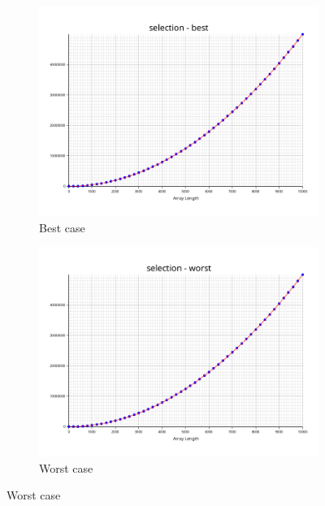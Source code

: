\documentclass[a4paper]{article}
\begin{document}
\begin{figure}[h]
  \begin{subfigure}[b]{0.4\textwidth}
    \includegraphics[width=\textwidth]{../plots/selection-best.png}
    \caption{Best case}
    \label{fig:selection-best}
  \end{subfigure}
  \begin{subfigure}[b]{0.4\textwidth}
    \includegraphics[width=\textwidth]{../plots/selection-worst.png}
    \caption{Worst case}
    \label{fig:selection-worst}
  \end{subfigure}
\end{figure}
\end{document}
